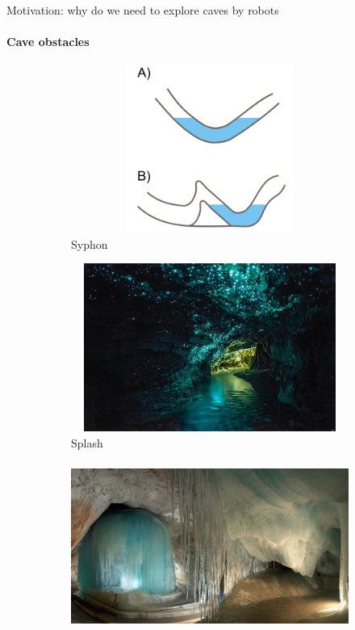 \documentclass[aspectratio=169]{beamer}
\begin{document}
\begin{frame}[t]{Motivation: why do we need to explore caves by robots}
    \framesubtitle{Cave obstacles}
    \begin{figure}[H]
        \begin{subfigure}{0.24\textwidth}
            \centering\includegraphics[height=5.5cm,width=1\textwidth,keepaspectratio]{siphon.png}
            \caption*{Syphon}
        \end{subfigure}
        \hfill
        \begin{subfigure}{0.24\textwidth}
            \centering\includegraphics[height=5.5cm,width=1\textwidth,keepaspectratio]{splash.png}
            \caption*{Splash}
        \end{subfigure}
        \hfill
        \begin{subfigure}{0.24\textwidth}
            \centering\includegraphics[height=5.5cm,width=1\textwidth,keepaspectratio]{ice.png}

\end{subfigure}
\end{figure}
\end{frame}
\end{document}
